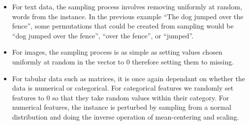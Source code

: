 \begin{itemize}
\item For text data, the sampling process involves removing uniformly at random, words from the instance. In the previous example ``The dog jumped over the fence'', some permutations that could be created from sampling would be ``dog jumped over the fence'', ``over the fence'', or ``jumped''.

\item For images, the sampling process is as simple as setting  values chosen uniformly at random in the vector to 0 therefore setting them to missing.

\item For tabular data such as matrices, it is once again dependant on whether the data is numerical or categorical. For categorical features we randomly set features to 0 so that they take random values within their category. For numerical features, the instance is perturbed by sampling from a normal distribution and doing the inverse operation of mean-centering and scaling.
\end{itemize}



